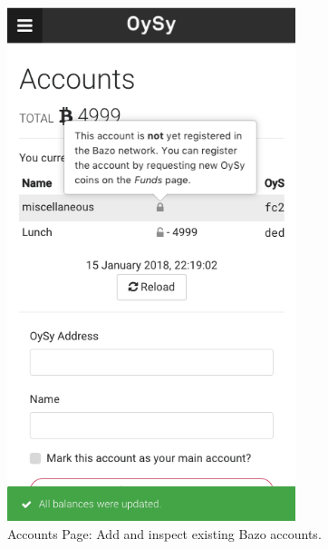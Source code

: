 \begin{figure}
\centering
\includegraphics[width=0.75\textwidth]{screenshots/Accounts.png}
\caption{\label{fig:uiaccounts}Accounts Page: Add and inspect existing Bazo accounts.}
\end{figure}

